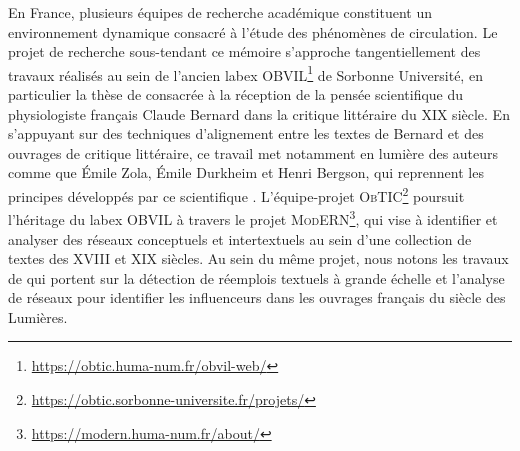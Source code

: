 En France, plusieurs équipes de recherche académique constituent un environnement dynamique consacré à l'étude des phénomènes de circulation. Le projet de recherche sous-tendant ce mémoire s'approche tangentiellement des travaux réalisés au sein de l'ancien labex \textsc{OBVIL}\footnote{\url{https://obtic.huma-num.fr/obvil-web/}} de Sorbonne Université, en particulier la thèse de \citet{riguet2018litterature} consacrée à la réception de la pensée scientifique du physiologiste français Claude Bernard dans la critique littéraire du \textsc{XIX}\ieme{} siècle. En s'appuyant sur des techniques d'alignement entre les textes de Bernard et des ouvrages de critique littéraire, ce travail met notamment en lumière des auteurs comme que Émile Zola, Émile Durkheim et Henri Bergson, qui reprennent les principes développés par ce scientifique \citep[p.~401]{riguet2018litterature}. L'équipe-projet \textsc{ObTIC}\footnote{\url{https://obtic.sorbonne-universite.fr/projets/}} poursuit l'héritage du labex \textsc{OBVIL} à travers le projet \textsc{ModERN}\footnote{\url{https://modern.huma-num.fr/about/}}, qui vise à identifier et analyser des réseaux conceptuels et intertextuels au sein d’une collection de textes des \textsc{XVIII}\ieme{} et \textsc{XIX}\ieme{} siècles. Au sein du même projet, nous notons les travaux de \citet{roe2023enlightenment} qui portent sur la détection de réemplois textuels à grande échelle et l'analyse de réseaux pour identifier les \og{}influenceurs\fg{} dans les ouvrages français du siècle des Lumières.

